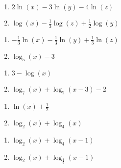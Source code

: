 \documentclass{ximera}
\begin{document}
\begin{multicols}{2}
\begin{enumerate}
\setcounter{enumi}{\value{HW}}
\item $2 \ln(x) -3 \ln(y) - 4\ln(z)$
\item $\log(x) - \frac{1}{3} \log(z) + \frac{1}{2} \log(y)$

\setcounter{HW}{\value{enumi}}
\end{enumerate}
\end{multicols}

\begin{multicols}{2}
\begin{enumerate}
\setcounter{enumi}{\value{HW}}

\item $-\frac{1}{3} \ln(x) - \frac{1}{3}\ln(y) + \frac{1}{3} \ln(z)$
\item $\log_{5}(x) - 3$

\setcounter{HW}{\value{enumi}}
\end{enumerate}
\end{multicols}

\begin{multicols}{2}
\begin{enumerate}
\setcounter{enumi}{\value{HW}}

\item $3 - \log(x)$
\item $\log_{7}(x) + \log_{7}(x - 3) - 2$

\setcounter{HW}{\value{enumi}}
\end{enumerate}
\end{multicols}

\begin{multicols}{2}
\begin{enumerate}
\setcounter{enumi}{\value{HW}}

\item $\ln(x) + \frac{1}{2}$ 
\item $\log_{2}(x) + \log_{4}(x)$ 

\setcounter{HW}{\value{enumi}}
\end{enumerate}
\end{multicols}

\begin{multicols}{2}
\begin{enumerate}
\setcounter{enumi}{\value{HW}}

\item $\log_{2}(x) + \log_{4}(x-1)$
\item $\log_{2}(x) + \log_{\frac{1}{2}}(x - 1)$ \label{combineloglast}

\setcounter{HW}{\value{enumi}}
\end{enumerate}
\end{multicols}
\end{document}
